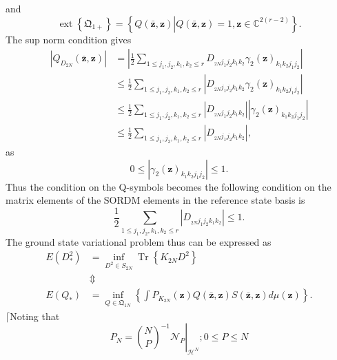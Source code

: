 \documentclass[aps,preprint]{revtex4}%
\begin{document}
and
\begin{equation}
\operatorname*{ext}\left\{  \mathfrak{Q}_{1+}\right\}  =\left\{  Q\left(
\mathbf{\bar{z},z}\right)  \left\vert Q\left(  \mathbf{\bar{z},z}\right)
=1,\mathbf{z\in}\mathbb{C}^{2\left(  r-2\right)  }\right.  \right\}  .
\end{equation}
The sup norm condition gives
\begin{align}
\left\vert Q_{D_{2N}}\left(  \mathbf{\bar{z}},\mathbf{z}\right)  \right\vert
&  =\left\vert \frac{1}{2}\sum_{1\leq j_{1},j_{2},k_{1},k_{2}\leq r}%
D_{_{2N}j_{1}j_{2}k_{1}k_{2}}\gamma_{2}\left(  \mathbf{z}\right)  _{k_{1}%
k_{2}j_{1}j_{2}}\right\vert \nonumber\\
&  \leq\frac{1}{2}\sum_{1\leq j_{1},j_{2},k_{1},k_{2}\leq r}\left\vert
D_{_{2N}j_{1}j_{2}k_{1}k_{2}}\gamma_{2}\left(  \mathbf{z}\right)  _{k_{1}%
k_{2}j_{1}j_{2}}\right\vert \nonumber\\
&  \leq\frac{1}{2}\sum_{1\leq j_{1},j_{2},k_{1},k_{2}\leq r}\left\vert
D_{_{2N}j_{1}j_{2}k_{1}k_{2}}\right\vert \left\vert \gamma_{2}\left(
\mathbf{z}\right)  _{k_{1}k_{2}j_{1}j_{2}}\right\vert \nonumber\\
&  \leq\frac{1}{2}\sum_{1\leq j_{1},j_{2},k_{1},k_{2}\leq r}\left\vert
D_{_{2N}j_{1}j_{2}k_{1}k_{2}}\right\vert ,
\end{align}
as
\begin{equation}
0\leq\left\vert \gamma_{2}\left(  \mathbf{z}\right)  _{k_{1}k_{2}j_{1}j_{2}%
}\right\vert \leq1.
\end{equation}
Thus the condition on the Q-symbols becomes the following condition on the
matrix elements of the SORDM elements in the reference state basis is
\begin{equation}
\frac{1}{2}\sum_{1\leq j_{1},j_{2},k_{1},k_{2}\leq r}\left\vert D_{_{2N}%
j_{1}j_{2}k_{1}k_{2}}\right\vert \leq1.
\end{equation}
The ground state variational problem thus can be expressed as
\begin{align}
E\left(  D_{\ast}^{2}\right)   &  =\inf_{D^{2}\in S_{2N}}\operatorname*{Tr}%
\left\{  K_{2N}D^{2}\right\} \nonumber\\
&  \Updownarrow\nonumber\\
E\left(  Q_{\ast}\right)   &  =\inf_{Q\in\mathfrak{Q}_{1N}}\left\{  \int
P_{K_{2N}}\left(  \mathbf{z}\right)  Q\left(  \mathbf{\bar{z}},\mathbf{z}%
\right)  S\left(  \mathbf{\bar{z},z}\right)  d\mu\left(  \mathbf{z}\right)
\right\}  .
\end{align}
$\lceil$Noting that
\begin{equation}
P_{N}=\left.  \binom{N}{P}^{-1}\mathcal{N}_{P}\right\vert _{\mathcal{H}^{N}%
};0\leq P\leq N
\end{equation}
\end{document}

